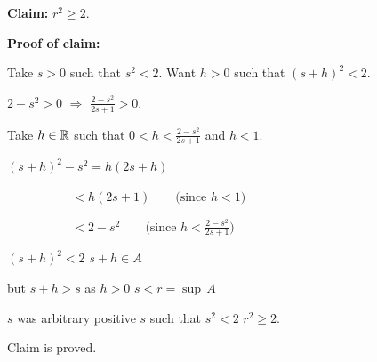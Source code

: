 \documentclass[10pt,aspectratio=169]{beamer}
\begin{document}
\begin{frame}
\textbf{Claim:} $r^2 \geq 2$.

\medskip
\pause

\textbf{Proof of claim:}

Take $s > 0$ such that $s^2 < 2$.
\quad
Want $h > 0$ such that ${(s+h)}^2 < 2$.

\medskip
\pause

$2-s^2 > 0$ \quad $\Rightarrow$ \quad $\frac{2-s^2}{2s+1} > 0$.

\medskip
\pause

Take $h \in {\mathbb{R}}$ such that $0 < h < \frac{2-s^2}{2s+1}$ and $h < 1$.

\medskip
\pause

$\displaystyle
{(s+h)}^2 - s^2 = h(2s + h)
$

\medskip
\pause

$\displaystyle
\, \quad \qquad \qquad < h(2s+1) \qquad  \bigl(\text{since } h < 1\bigr)
$

\medskip
\pause

$\displaystyle
\, \quad \qquad \qquad < 2-s^2 \qquad \bigl(\text{since } h < \tfrac{2-s^2}{2s+1} \bigr)
$

\medskip
\pause

\thus \quad ${(s+h)}^2 < 2$ \wthus $s+h \in A$

\medskip
\pause

but $s+h > s$ as $h > 0$ \wwthus $s < r = \sup\, A$

\medskip
\pause

$s$ was arbitrary positive $s$ such that $s^2 < 2$ \wwthus $r^2 \geq 2$.

\medskip
\pause

Claim is proved.
\end{frame}
\end{document}
